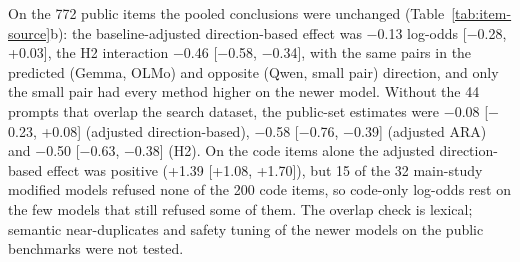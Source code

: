 On the 772 public items the pooled conclusions were unchanged
(Table~\ref{tab:item-source}b): the baseline-adjusted direction-based effect
was $-$0.13 log-odds [$-$0.28, +0.03], the H2 interaction $-$0.46 [$-$0.58,
$-$0.34], with the same pairs in the predicted (Gemma, OLMo) and opposite
(Qwen, small pair) direction, and only the small pair had every method higher
on the newer model. Without the 44 prompts that overlap the search dataset,
the public-set estimates were $-$0.08 [$-$0.23, +0.08] (adjusted
direction-based), $-$0.58 [$-$0.76, $-$0.39] (adjusted ARA) and $-$0.50
[$-$0.63, $-$0.38] (H2). On the code items alone the adjusted direction-based
effect was positive (+1.39 [+1.08, +1.70]), but 15 of the 32 main-study
modified models refused none of the 200 code items, so code-only log-odds rest
on the few models that still refused some of them. The overlap check is
lexical; semantic near-duplicates and safety tuning of the newer models on the
public benchmarks were not tested.

